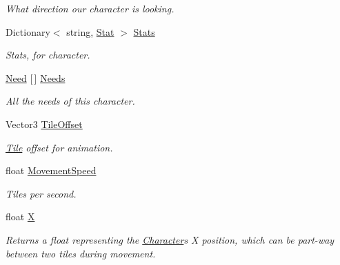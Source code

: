 \begin{DoxyCompactItemize}
\begin{DoxyCompactList}\small\item\em What direction our character is looking. \end{DoxyCompactList}\item 
Dictionary$<$ string, \hyperlink{class_project_porcupine_1_1_entities_1_1_stat}{Stat} $>$ \hyperlink{class_project_porcupine_1_1_entities_1_1_character_a6c6632eda9fdf6d2739291d69faf73ec}{Stats}
\begin{DoxyCompactList}\small\item\em Stats, for character. \end{DoxyCompactList}\item 
\hyperlink{class_project_porcupine_1_1_entities_1_1_need}{Need} \mbox{[}$\,$\mbox{]} \hyperlink{class_project_porcupine_1_1_entities_1_1_character_ac92263a27f7fd4001b18d0b01b24ab2f}{Needs}
\begin{DoxyCompactList}\small\item\em All the needs of this character. \end{DoxyCompactList}\item 
Vector3 \hyperlink{class_project_porcupine_1_1_entities_1_1_character_a6c11db7332986df6ee844a427a230b43}{Tile\+Offset}
\begin{DoxyCompactList}\small\item\em \hyperlink{class_tile}{Tile} offset for animation. \end{DoxyCompactList}\item 
float \hyperlink{class_project_porcupine_1_1_entities_1_1_character_abf864a3d09e08bac14e8dae22fb16bac}{Movement\+Speed}
\begin{DoxyCompactList}\small\item\em Tiles per second. \end{DoxyCompactList}\item 
float \hyperlink{class_project_porcupine_1_1_entities_1_1_character_aad15ce6a42a7c6196f6ee9635d5955f1}{X}
\begin{DoxyCompactList}\small\item\em Returns a float representing the \hyperlink{class_project_porcupine_1_1_entities_1_1_character}{Character}\textquotesingle{}s X position, which can be part-\/way between two tiles during movement. \end{DoxyCompactList}\item 

\end{DoxyCompactItemize}
